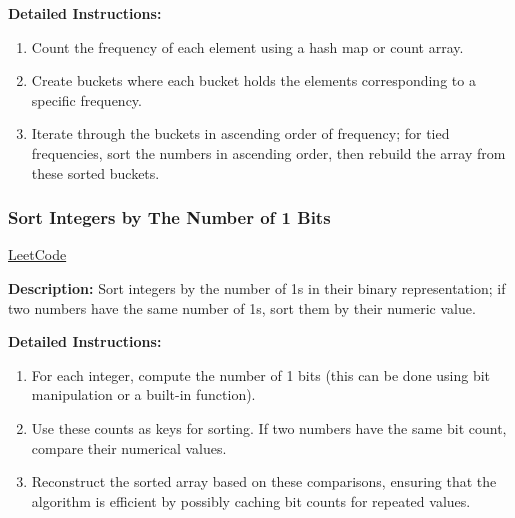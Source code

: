 \textbf{Detailed Instructions:}
\begin{enumerate}
    \item Count the frequency of each element using a hash map or count array.
    \item Create buckets where each bucket holds the elements corresponding to a specific frequency.
    \item Iterate through the buckets in ascending order of frequency; for tied frequencies, sort the numbers in ascending order, then rebuild the array from these sorted buckets.
\end{enumerate}

\subsubsection{Sort Integers by The Number of 1 Bits}
\href{https://leetcode.com/problems/sort-integers-by-the-number-of-1-bits/}{LeetCode}

\textbf{Description:} Sort integers by the number of 1s in their binary representation; if two numbers have the same number of 1s, sort them by their numeric value.

\textbf{Detailed Instructions:}
\begin{enumerate}
    \item For each integer, compute the number of 1 bits (this can be done using bit manipulation or a built-in function).
    \item Use these counts as keys for sorting. If two numbers have the same bit count, compare their numerical values.
    \item Reconstruct the sorted array based on these comparisons, ensuring that the algorithm is efficient by possibly caching bit counts for repeated values.
\end{enumerate}